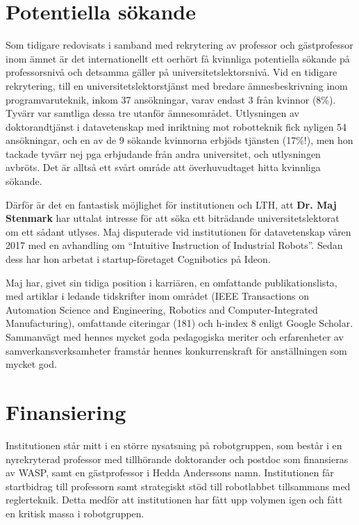 \documentclass[11pt,a4paper]{article}
\begin{document}
\section{Potentiella sökande}
Som tidigare redovisats i samband med rekrytering av professor och gästprofessor inom ämnet är det internationellt ett oerhört få kvinnliga potentiella sökande på professorsnivå och detsamma gäller på universitetslektorsnivå. Vid en tidigare rekrytering, till en universitetslektorstjänst med bredare ämnesbeskrivning inom programvaruteknik, inkom 37 ansökningar, varav endast 3 från kvinnor (8\%). Tyvärr var samtliga dessa tre utanför ämnesområdet. Utlysningen av doktorandtjänst i datavetenskap med inriktning mot robotteknik fick nyligen 54 ansökningar, och en av de 9 sökande kvinnorna erbjöds tjänsten (17\%!), men hon tackade tyvärr nej pga erbjudande från andra universitet, och utlysningen avbröts. Det är alltså ett svårt område att överhuvudtaget hitta kvinnliga sökande. 

Därför är det en fantastisk möjlighet för institutionen och LTH, att \textbf{Dr. Maj Stenmark} har uttalat intresse för att söka ett biträdande universitetslektorat om ett sådant utlyses. Maj disputerade vid institutionen för datavetenskap våren 2017 med en avhandling om ``Intuitive Instruction of Industrial Robots''. Sedan dess har hon arbetat i startup-företaget Cognibotics på Ideon. 

Maj har, givet sin tidiga position i karriären, en omfattande publikationslista, med artiklar i ledande tidskrifter inom området (IEEE Transactions on Automation Science and Engineering, Robotics and Computer-Integrated Manufacturing), omfattande citeringar (181) och h-index 8 enligt Google Scholar. %
 Sammanvägt med hennes mycket goda pedagogiska meriter och erfarenheter av samverkansverksamheter framstår hennes konkurrenskraft för anställningen som mycket god.

\section{Finansiering}
Institutionen står mitt i en större nysatsning på robotgruppen, som består i en nyrekryterad professor med tillhörande doktorander och postdoc som finansieras av WASP, samt en gästprofessor i Hedda Anderssons namn. Institutionen får startbidrag till professorn samt strategiskt stöd till robotlabbet tillsammans med reglerteknik. Detta medför att institutionen har fått upp volymen igen och fått en kritisk massa i robotgruppen. 
\end{document}
